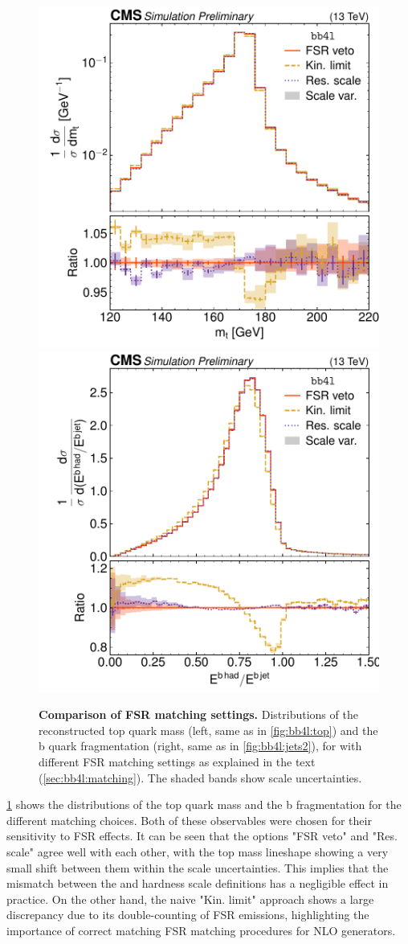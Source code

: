 \begin{figure}[tp]
    \centering
    \includegraphics[width=0.49 \textwidth]{figures/bb4l/matching/ADDED_top_mass.pdf}
    \hfill
    \includegraphics[width=0.49 \textwidth]{figures/bb4l/matching/MC_HFJETS_efracB.pdf}
    \caption{\textbf{Comparison of FSR matching settings.} Distributions of the reconstructed top quark mass (left, same as in \cref{fig:bb4l:top}) and the b quark fragmentation (right, same as in \cref{fig:bb4l:jets2}), for \bbfourl with different FSR matching settings as explained in the text (\cref{sec:bb4l:matching}). The shaded bands show scale uncertainties.}
    \label{fig:bb4l:matching}
\end{figure}

\cref{fig:bb4l:matching} shows the distributions of the top quark mass and the b fragmentation for the different matching choices. Both of these observables were chosen for their sensitivity to FSR effects. It can be seen that the options "FSR veto" and "Res. scale" agree well with each other, with the top mass lineshape showing a very small shift between them within the scale uncertainties. This implies that the mismatch between the \powheg and \pythia hardness scale definitions has a negligible effect in practice. On the other hand, the naive "Kin. limit" approach shows a large discrepancy due to its double-counting of FSR emissions, highlighting the importance of correct matching FSR matching procedures for NLO generators.


